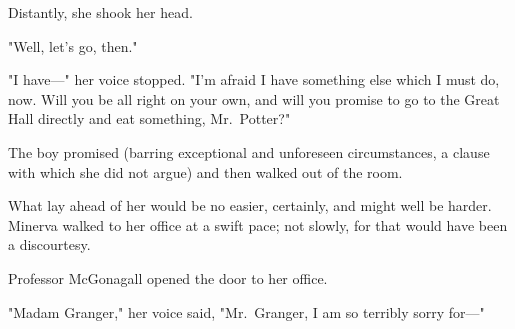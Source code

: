 Distantly, she shook her head.

"Well, let's go, then."

"I have—" her voice stopped. "I'm afraid I have something else which I must
do, now. Will you be all right on your own, and will you promise to go to the
Great Hall directly and eat something, Mr.~Potter?"

The boy promised (barring exceptional and unforeseen circumstances, a clause
with which she did not argue) and then walked out of the room.

What lay ahead of her{\el} would be no easier, certainly, and might well be
harder.
\sbreak
Minerva walked to her office at a swift pace; not slowly, for that would have
been a discourtesy.

Professor McGonagall opened the door to her office.

"Madam Granger," her voice said, "Mr.~Granger, I am so terribly sorry for—"
